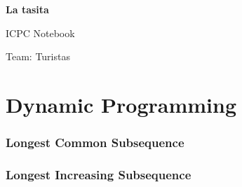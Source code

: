 \documentclass[12pt, a4paper]{report}
\let\oldsection\section
\renewcommand{\section}{\clearpage\oldsection}
\begin{document}
\begin{titlepage}
    \centering
    \vspace*{\fill}
    
    {\Huge \textbf{La tasita}} %
    
    \vfill
    
    {\Large ICPC Notebook} %
    
    \vfill
    
    {\large Team: Turistas } %
    
    \vfill
\end{titlepage}

\tableofcontents %
\newpage

%

\part{Dynamic Programming}
\setcounter{section}{0} %

\section{Longest Common Subsequence} %


\section{Longest Increasing Subsequence} 

\end{document}
